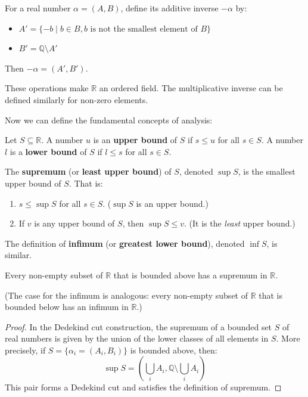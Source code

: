 \begin{definition}
For a real number $\alpha = (A, B)$, define its additive inverse $-\alpha$ by:
\begin{itemize}
    \item $A' = \{-b \mid b \in B, b \text{ is not the smallest element of } B\}$
    \item $B' = \mathbb{Q} \setminus A'$
\end{itemize}
Then $-\alpha = (A', B')$.
\end{definition}

These operations make $\mathbb{R}$ an ordered field. The multiplicative inverse can be defined similarly for non-zero elements.

Now we can define the fundamental concepts of analysis:

\begin{definition}
Let $S \subseteq \mathbb{R}$. A number $u$ is an \textbf{upper bound} of $S$ if $s \le u$ for all $s \in S$. A number $l$ is a \textbf{lower bound} of $S$ if $l \le s$ for all $s \in S$.
\end{definition}

\begin{definition}[Supremum]
The \textbf{supremum} (or \textbf{least upper bound}) of $S$, denoted $\sup S$, is the smallest upper bound of $S$. That is:
\begin{enumerate}
    \item $s \le \sup S$ for all $s \in S$. ($\sup S$ is an upper bound.)
    \item If $v$ is any upper bound of $S$, then $\sup S \le v$. (It is the \emph{least} upper bound.)
\end{enumerate}
The definition of \textbf{infimum} (or \textbf{greatest lower bound}), denoted $\inf S$, is similar.
\end{definition}

\begin{theorem}
Every non-empty subset of $\mathbb{R}$ that is bounded above has a supremum in $\mathbb{R}$.
\end{theorem}
(The case for the infimum is analogous: every non-empty subset of $\mathbb{R}$ that is bounded below has an infimum in $\mathbb{R}$.)

\begin{proof}
In the Dedekind cut construction, the supremum of a bounded set $S$ of real numbers is given by the union of the lower classes of all elements in $S$. More precisely, if $S = \{\alpha_i = (A_i, B_i)\}$ is bounded above, then:
\[
\sup S = \left(\bigcup_i A_i, \mathbb{Q} \setminus \bigcup_i A_i\right)
\]
This pair forms a Dedekind cut and satisfies the definition of supremum.
\end{proof}

